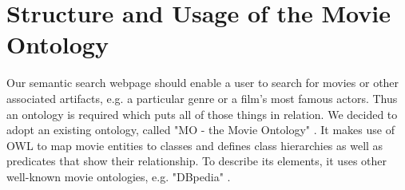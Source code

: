 \section{Structure and Usage of the Movie Ontology}
Our semantic search webpage should enable a user to search for movies or other associated artifacts, e.g. a particular genre or a film's most famous actors. Thus an ontology is required which puts all of those things in relation. We decided to adopt an existing ontology, called "MO - the Movie Ontology" \cite{bouza:movieontology}. It makes use of OWL to map movie entities to classes and defines class hierarchies as well as predicates that show their relationship. To describe its elements, it uses other well-known movie ontologies, e.g. "DBpedia" \cite{dbpedia}.